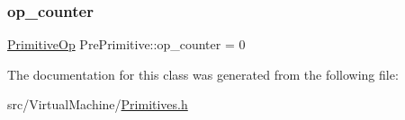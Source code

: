 \subsubsection{\texorpdfstring{op\+\_\+counter}{op\_counter}}
{\footnotesize\ttfamily \hyperlink{_instruction_8h_a227278394efd1e2313c727102db09ea9}{Primitive\+Op} Pre\+Primitive\+::op\+\_\+counter = 0\hspace{0.3cm}{\ttfamily [static]}}



The documentation for this class was generated from the following file\+:\begin{DoxyCompactItemize}
\item 
src/\+Virtual\+Machine/\hyperlink{_primitives_8h}{Primitives.\+h}\end{DoxyCompactItemize}
